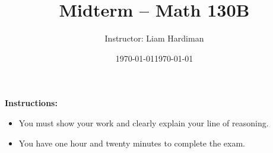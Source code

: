 \documentclass[11pt]{article}
\date{\today}
\title{Midterm -- Math 130B}
\author{Instructor: Liam Hardiman}
\date{\today}
\theoremstyle{plain}
\begin{document}
\maketitle


{\bf Instructions: } \begin{itemize} 
\item You must show your work and clearly
explain your line of reasoning.
\item You have one hour and twenty minutes to complete the exam.
\end{itemize}

\medskip
\medskip


\newpage
\ 
\newpage
\end{document}
